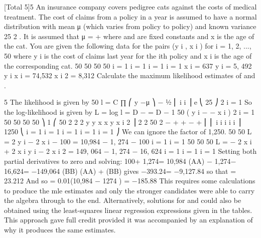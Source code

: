 [Total 5]5
An insurance company covers pedigree cats against the costs of medical treatment.
The cost of claims from a policy in a year is assumed to have a normal distribution
with mean μ (which varies from policy to policy) and known variance 25 2 . It is
assumed that μ = \alpha  + \betax where \alpha  and \beta are fixed constants and x is the age of the cat.
You are given the following data for the pairs (y i , x i ) for i = 1, 2, ..., 50 where y i is the
cost of claims last year for the ith policy and x i is the age of the corresponding cat.
50 50 50 50
i = 1 i = 1 i = 1 i = 1
\sum  x i = 637 \sum  y i = 5, 492 \sum  y i x i = 74,532 \sum  x i 2 = 8,312
Calculate the maximum likelihood estimates of \alpha  and \beta.



5
The likelihood is given by
50
l = C \times  ∏
⎛ y −μ ⎞
− 1⁄2 ⎜ i i ⎟
e ⎝ 25 ⎠
2
i = 1
So the log-likelihood is given by
L = log l = D −
= D −
1 50
( y i − \alpha  − \beta x i ) 2
 i = 1
50
50
50
50
⎞
1 ⎛ 50 2
2
2
y
y
x
x
y
x i 2 ⎟
2
2
50
2
−
\alpha 
+
\alpha \beta
+
\alpha 
−
\beta
+
\beta
⎜ ⎜ \sum  i
\sum 
\sum 
\sum 
\sum 
i
i
i i
⎟
1250 ⎝ i = 1
i = 1
i = 1
i = 1
i = 1
⎠
We can ignore the factor of 1,250.
50
50
\frac{\partial}{\partial} L
= 2 \sum  y i − 2 \beta \sum  x i − 100 \alpha  = 10,984 − 1, 274 \beta − 100 \alpha 
\frac{\partial}{\partial}\alpha 
i = 1
i = 1
50
50
50
\frac{\partial}{\partial} L
= − 2 \alpha  \sum  x i + 2 \sum  x i y i − 2 \beta \sum  x i 2 = 149, 064 − 1, 274 \alpha  − 16, 624 \beta
\frac{\partial}{\partial}\beta
i = 1
i = 1
i = 1
Setting both partial derivatives to zero and solving:
100\alpha  + 1,274\beta = 10,984
(AA)
− 1,274\alpha  − 16,624\beta = −149,064 (BB)
(AA)  + (BB) gives −393.24\beta = −9,127.84 so that \beta = 23.212
And so \alpha  = 0.01(10,984 − 1274 ) = −185.88
This requires some calculations to produce the mle estimates and only the stronger
candidates were able to carry the algebra through to the end. Alternatively, solutions for
and could also be obtained using the least-squares linear regression expressions given in
the tables. This approach gave full credit provided it was accompanied by an explanation of
why it produces the same estimates.
